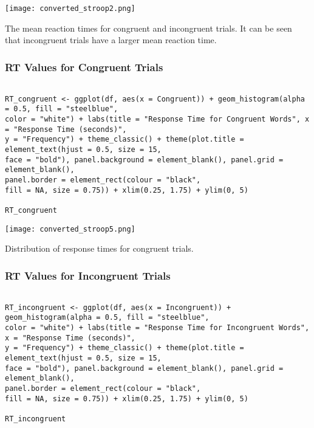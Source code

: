 \documentclass{article}
\begin{document}
\begin{center}
\texttt{[image: converted\_stroop2.png]}
\end{center}

\begin{center}
The mean reaction times for congruent and incongruent trials. It can be seen \\ that incongruent trials have a larger mean reaction time.
\end{center}

\subsubsection{RT Values for Congruent Trials}
\label{sec:orgcaae9bc}
\begin{verbatim}

RT_congruent <- ggplot(df, aes(x = Congruent)) + geom_histogram(alpha = 0.5, fill = "steelblue", 
color = "white") + labs(title = "Response Time for Congruent Words", x = "Response Time (seconds)", 
y = "Frequency") + theme_classic() + theme(plot.title = element_text(hjust = 0.5, size = 15, 
face = "bold"), panel.background = element_blank(), panel.grid = element_blank(), 
panel.border = element_rect(colour = "black", 
fill = NA, size = 0.75)) + xlim(0.25, 1.75) + ylim(0, 5)

RT_congruent

\end{verbatim}

\begin{center}
\texttt{[image: converted\_stroop5.png]}
\end{center}

\begin{center}
Distribution of response times for congruent trials.
\end{center}

\subsubsection{RT Values for Incongruent Trials}
\label{sec:org27189dd}
\begin{verbatim}

RT_incongruent <- ggplot(df, aes(x = Incongruent)) + geom_histogram(alpha = 0.5, fill = "steelblue", 
color = "white") + labs(title = "Response Time for Incongruent Words", x = "Response Time (seconds)", 
y = "Frequency") + theme_classic() + theme(plot.title = element_text(hjust = 0.5, size = 15, 
face = "bold"), panel.background = element_blank(), panel.grid = element_blank(), 
panel.border = element_rect(colour = "black", 
fill = NA, size = 0.75)) + xlim(0.25, 1.75) + ylim(0, 5)

RT_incongruent

\end{verbatim}
\end{document}
